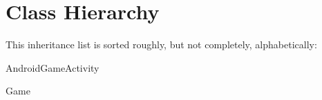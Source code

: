 \section{Class Hierarchy}
This inheritance list is sorted roughly, but not completely, alphabetically\+:\begin{DoxyCompactList}
\item Android\+Game\+Activity\begin{DoxyCompactList}
\item {}
\end{DoxyCompactList}
\item Game\begin{DoxyCompactList}
\item {}
\end{DoxyCompactList}
\item {}
\begin{DoxyCompactList}
\item {}
\item {}
\end{DoxyCompactList}
\item {}
\end{DoxyCompactList}

